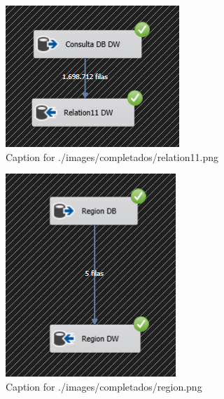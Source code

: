 \documentclass{article}
\begin{document}
\begin{figure}[H]
  \centering
  \includegraphics[width=\linewidth]{./images/completados/relation11.png}
  \caption{Caption for ./images/completados/relation11.png}
\end{figure}
\begin{figure}[H]
  \centering
  \includegraphics[width=\linewidth]{./images/completados/region.png}
  \caption{Caption for ./images/completados/region.png}
\end{figure}
\end{document}
